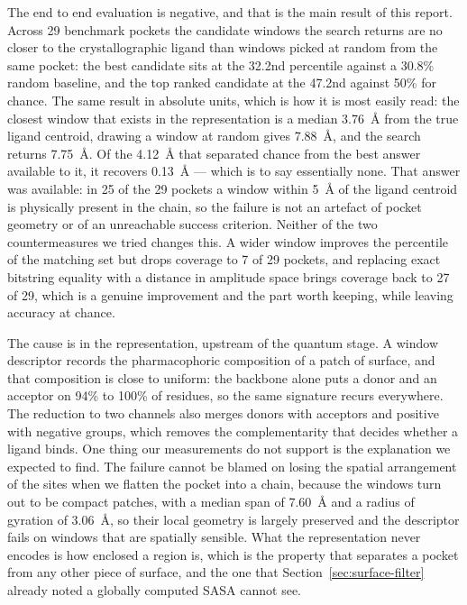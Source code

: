 The end to end evaluation is negative, and that is the main result of this report. Across
29 benchmark pockets the candidate windows the search returns are no closer to the
crystallographic ligand than windows picked at random from the same pocket: the best
candidate sits at the 32.2nd percentile against a 30.8\% random baseline, and the top
ranked candidate at the 47.2nd against 50\% for chance. The same result in absolute units,
which is how it is most easily read: the closest window that exists in the representation
is a median 3.76~\AA{} from the true ligand centroid, drawing a window at random gives
7.88~\AA{}, and the search returns 7.75~\AA{}. Of the 4.12~\AA{} that separated chance
from the best answer available to it, it recovers 0.13~\AA{} --- which is to say
essentially none. That answer was available: in
25 of the 29 pockets a window within 5~\AA{} of the ligand centroid is physically present
in the chain, so the failure is not an artefact of pocket geometry or of an unreachable
success criterion. Neither of the two countermeasures we tried changes this. A wider window improves the percentile of the matching set but
drops coverage to 7 of 29 pockets, and replacing exact bitstring equality with a distance
in amplitude space brings coverage back to 27 of 29, which is a genuine improvement and
the part worth keeping, while leaving accuracy at chance.

The cause is in the representation, upstream of the quantum stage. A window descriptor
records the pharmacophoric composition of a patch of surface, and that composition is
close to uniform: the backbone alone puts a donor and an acceptor on 94\% to 100\% of
residues, so the same signature recurs everywhere. The reduction to two channels also
merges donors with acceptors and positive with negative groups, which removes the
complementarity that decides whether a ligand binds. One thing our measurements do not
support is the explanation we expected to find. The failure cannot be blamed on losing
the spatial arrangement of the sites when we flatten the pocket into a chain, because the
windows turn out to be compact patches, with a median span of 7.60~\AA{} and a radius of
gyration of 3.06~\AA{}, so their local geometry is largely preserved and the descriptor
fails on windows that are spatially sensible. What the representation never encodes is
how enclosed a region is, which is the property that separates a pocket from any other
piece of surface, and the one that Section~\ref{sec:surface-filter} already noted a globally
computed SASA cannot see.

